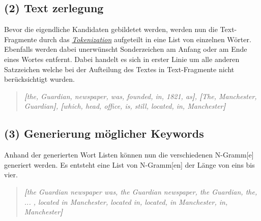 \subsection{(2) Text zerlegung}
Bevor die eigendliche Kandidaten gebildetet werden, werden nun die Text-Fragmente durch das \hyperref[tokenization]{\textit{Tokenization}} aufgeteilt in eine List von einzelnen Wörter. Ebenfalls werden dabei unerwünscht Sonderzeichen am Anfang oder am Ende eines Wortes entfernt. Dabei handelt es sich in erster Linie um alle anderen Satzzeichen welche bei der Aufteilung des Textes in Text-Fragmente nicht berücksichtigt wurden.

\begin{quote}
\textit{\textbf{[}the, Guardian, newspaper, was, founded, in, 1821, as\textbf{]}, \textbf{[}The, Manchester, Guardian\textbf{]}, \textbf{[}which, head, office, is, still, located, in, Manchester\textbf{]}}
\end{quote}

\subsection{(3) Generierung möglicher Keywords}
Anhand der generierten Wort Listen können nun die verschiedenen \gls{N-Gramm}[e] generiert werden. Es entsteht eine List von \gls{N-Gramm}[en] der Länge von eins bis vier.

\begin{quote}
\textit{\textbf{[}the Guardian newspaper was, the Guardian newspaper, the Guardian, the, ... , located in Manchester, located in, located, in Manchester, in, Manchester\textbf{]}}
\end{quote}

